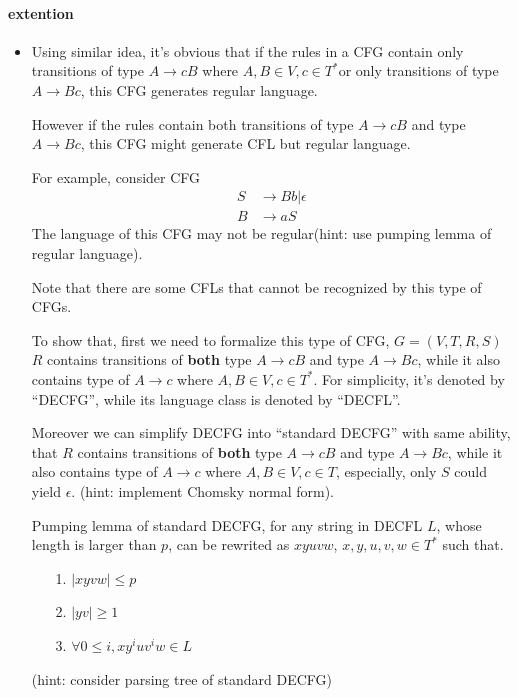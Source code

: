 \documentclass{article}
\begin{document}
    \paragraph*{extention}

    \begin{itemize}
        \item 
            Using similar idea, it's obvious that if the rules in a CFG contain only transitions of type $A \rightarrow cB$ where $A, B \in V, c \in T^{*}$or only transitions of type $A \rightarrow Bc$, this CFG generates regular language.

            However if the rules contain both transitions of type $A \rightarrow cB$ and type $A \rightarrow Bc$, this CFG might generate CFL but regular language.
        
            For example, consider CFG
            \begin{align*}
                S & \rightarrow Bb | \epsilon \\
                B & \rightarrow aS
            \end{align*}
            The language of this CFG may not be regular(hint: use pumping lemma of regular language). 
        
            Note that there are some CFLs that cannot be recognized by this type of CFGs.
        
            To show that, first we need to formalize this type of CFG, $G = (V, T, R, S)$
            $R$ contains transitions of \textbf{both} type $A \rightarrow cB$ and type $A \rightarrow Bc$, while it also contains type of $A \rightarrow c$ where $A,B \in V, c \in T^{*}$.  For simplicity, it's denoted by ``DECFG'', while its language class is denoted by ``DECFL''.
            
            Moreover we can simplify DECFG into ``standard DECFG'' with same ability, that $R$ contains transitions of \textbf{both} type $A \rightarrow cB$ and type $A \rightarrow Bc$, while it also contains type of $A \rightarrow c$ where $A,B \in V,c \in T$, especially, only $S$ could yield $\epsilon$. (hint: implement Chomsky normal form).
            
            Pumping lemma of standard DECFG, for any string in DECFL $L$, whose length is larger than $p$, can be rewrited as $xyuvw$, $x, y, u, v, w \in T^{*}$ such that.
        
            \begin{itemize}
                \item[1.] $|xyvw| \leq p$
                \item[2.] $|yv| \geq 1$
                \item[3.] $\forall 0 \leq i,xy^{i}uv^{i}w \in L$  
            \end{itemize}
            (hint: consider parsing tree of standard DECFG)
            

\end{itemize}
\end{document}
